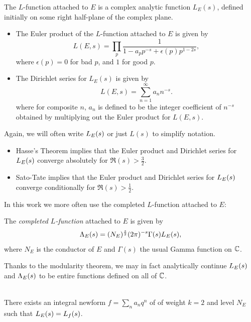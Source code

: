 \begin{definition} \mbox{}

The $L$-function attached to $E$ is a complex analytic function $L_E(s)$, defined initially on some right half-plane of the complex plane.
\begin{itemize}
\item The Euler product of the $L$-function attached to $E$ is given by
\begin{equation}
L(E,s) = \prod_{p} \frac{1}{1 - a_p p^{-s} + \epsilon(p)p^{1-2s}},
\end{equation}
where $\epsilon(p) = 0$ for bad $p$, and $1$ for good $p$.
\item The Dirichlet series for $L_E(s)$ is given by
\begin{equation}
L(E,s) = \sum_{n=1}^{\infty} a_n n^{-s}.
\end{equation}
where for composite $n$, $a_n$ is defined to be the integer coefficient of $n^{-s}$ obtained by multiplying out the Euler product for $L(E,s)$.
\end{itemize}
\end{definition}
Again, we will often write $L_E(s)$ or just $L(s)$ to simplify notation. \\

\begin{corollary} \mbox{}
\begin{itemize}
\item Hasse's Theorem implies that the Euler product and Dirichlet series for $L_E(s)$ converge absolutely for $\Re(s) > \frac{3}{2}$.
\item Sato-Tate implies that the Euler product and Dirichlet series for $L_E(s)$ converge conditionally for $\Re(s) > \frac{1}{2}$.
\end{itemize}
\end{corollary}

In this work we more often use the completed $L$-function attached to $E$:
\begin{definition}
The {\it completed $L$-function} attached to $E$ is given by
\begin{equation}
\Lambda_E(s) = (N_E)^{\frac{s}{2}}(2\pi)^{-s}\Gamma(s)L_E(s),
\end{equation}
where $N_E$ is the conductor of $E$ and $\Gamma(s)$ the usual Gamma function on $\mathbb{C}$.
\end{definition}

Thanks to the modularity theorem, we may in fact analytically continue $L_E(s)$ and $\Lambda_E(s)$ to be entire functions defined on all of $\mathbb{C}$.
\begin{theorem} \mbox{}\\
There exists an integral newform $f = \sum_n a_n q^n$ of of weight $k=2$ and level $N_E$ such that $L_E(s) = L_f(s)$.
\end{theorem}

